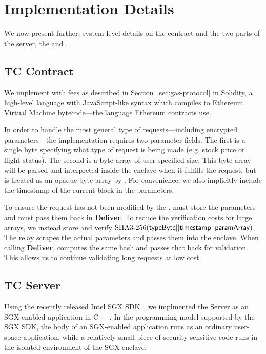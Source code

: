 
\section{\tc Implementation Details}
\label{sec:impl}

We now present further, system-level details on the \tc contract \tcont and the two parts of the \tc server, the \encname and \medname.

\subsection{TC Contract} 

We implement \tcont with fees as described in Section~\ref{sec:gas-protocol} in Solidity,
a high-level language with JavaScript-like syntax which compiles to Ethereum Virtual Machine bytecode---the language Ethereum contracts use.

In order to handle the most general type of requests---including encrypted parameters---the \tcont implementation requires two parameter fields.
The first is a single byte specifying what type of request is being made (e.g. stock price or flight status).
The second is a byte array of user-specified size.
This byte array will be parsed and interpreted inside the enclave when it fulfills the request, but is treated as an opaque byte array by \tcont.
For convenience, we also implicitly include the timestamp of the current block in the parameters.

To ensure the request has not been modified by the \medname, \tcont must store the parameters and \tc must pass them back in {\bf Deliver}.
To reduce the verification costs for large arrays, we instead store and verify $\text{SHA3-256}({\sf typeByte} || {\sf timestamp} || {\sf paramArray})$.
The relay scrapes the actual parameters and passes them into the enclave.
When calling {\bf Deliver}, \enclaveprog computes the same hash and passes that back for validation.
This allows us to continue validating long requests at low cost.



\subsection{TC Server}
Using the recently released Intel SGX SDK~\cite{sgxsdk}, we implmented the \tc
Server as an SGX-enabled application in C++. In the programming model supported
by the SGX SDK, the body of an SGX-enabled application runs as an ordinary
user-space application, while a relatively small piece of security-sensitive
code runs in the isolated environment of the SGX enclave.

